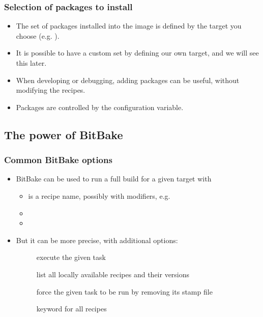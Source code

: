 \begin{frame}
  \frametitle{Selection of packages to install}
  \begin{itemize}
    \item The set of packages installed into the image is defined by
      the target you choose (e.g. ).
    \item It is possible to have a custom set by defining our own
      target, and we will see this later.
    \item When developing or debugging, adding packages can be useful,
      without modifying the recipes.
    \item Packages are controlled by the 
      configuration variable.
  \end{itemize}
\end{frame}

\subsection{The power of BitBake}

\begin{frame}
  \frametitle{Common BitBake options}
  \begin{itemize}
    \item BitBake can be used to run a full build for a given target
      with 
    \begin{itemize}
      \item {} is a recipe name, possibly with modifiers,
        e.g. 
      \item {}
      \item {}
    \end{itemize}
    \item But it can be more precise, with additional options:
    \begin{description}
      \item[] execute the given task
      \item[] list all locally available recipes and their
        versions
      \item[] force the given task to be run by removing its
        stamp file
      \item[] keyword for all recipes
    \end{description}
  \end{itemize}
\end{frame}


